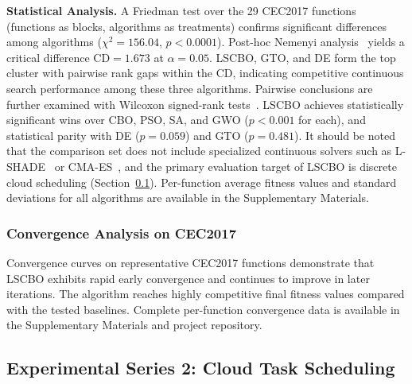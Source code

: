 \documentclass[pdflatex,onecolumn,sn-mathphys-num]{sn-jnl}
\begin{document}
\textbf{Statistical Analysis.} A Friedman test over the 29 CEC2017 functions (functions as blocks, algorithms as treatments) confirms significant differences among algorithms ($\chi^2 = 156.04$, $p < 0.0001$). Post-hoc Nemenyi analysis~\cite{Demsar2006} yields a critical difference $\mathrm{CD} = 1.673$ at $\alpha = 0.05$. LSCBO, GTO, and DE form the top cluster with pairwise rank gaps within the CD, indicating competitive continuous search performance among these three algorithms. Pairwise conclusions are further examined with Wilcoxon signed-rank tests~\cite{Wilcoxon1945}. LSCBO achieves statistically significant wins over CBO, PSO, SA, and GWO ($p < 0.001$ for each), and statistical parity with DE ($p = 0.059$) and GTO ($p = 0.481$). It should be noted that the comparison set does not include specialized continuous solvers such as L-SHADE~\cite{Tanabe2014} or CMA-ES~\cite{Hansen2001}, and the primary evaluation target of LSCBO is discrete cloud scheduling (Section~\ref{sec:cloudsim_exp}). Per-function average fitness values and standard deviations for all algorithms are available in the Supplementary Materials.

\subsubsection{Convergence Analysis on CEC2017}
Convergence curves on representative CEC2017 functions demonstrate that LSCBO exhibits rapid early convergence and continues to improve in later iterations. The algorithm reaches highly competitive final fitness values compared with the tested baselines. Complete per-function convergence data is available in the Supplementary Materials and project repository.

\subsection{Experimental Series 2: Cloud Task Scheduling}\label{sec:cloudsim_exp}
\end{document}
